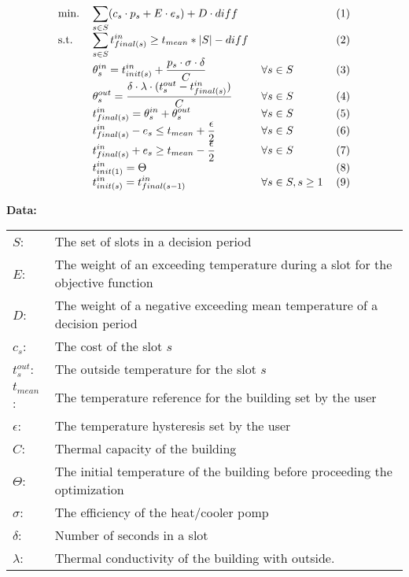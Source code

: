 \documentclass{article}
\begin{document}





\begin{align*}
\begin{tabular}{llll}
min. & $\displaystyle{\sum_{s \in S}(c_s \cdot p_s + E \cdot e_s) + D \cdot diff}$  &  & (1) \\
{s.t.} & $\displaystyle{\sum_{s \in S} t^{in}_{final(s)} \ge t_{mean}*|S| - diff}$ &  & (2) \\
& $\displaystyle{ \theta_{s}^{in} = t^{in}_{init(s)} + \frac{p_s \cdot \sigma \cdot \delta}{C}}$ & $\displaystyle{ \forall s \in S}$ & (3) \\
& $\displaystyle{\theta_{s}^{out} = \frac{\delta \cdot \lambda \cdot (t^{out}_s - t^{in}_{final(s)})}{C}}$ &  $\displaystyle{ \forall s \in S}$ & (4) \\
& $\displaystyle{t^{in}_{final(s)} = \theta^{in}_s + \theta^{out}_s}$ & $\displaystyle{ \forall s \in S}$ & (5) \\
& $\displaystyle{t^{in}_{final(s)} - e_s \le t_{mean} + \frac{\epsilon}{2}}$ & $\displaystyle{ \forall s \in S}$ & (6) \\
& $\displaystyle{t^{in}_{final(s)} + e_s \ge t_{mean} - \frac{\epsilon}{2}}$ & $\displaystyle{ \forall s \in S}$ & (7) \\
& $\displaystyle{t^{in}_{init(1)}} = \Theta$ & & (8) \\
& $\displaystyle{t^{in}_{init(s)} = t^{in}_{final(s-1)}}$ & $\displaystyle{ \forall s \in S, s \ge 1}$ & (9) \\
\end{tabular}
\end{align*}

\noindent
\textbf{Data:} \\
\begin{tabular}{ l p{} }
$S$: & The set of slots in a decision period \\
$E$: & The weight of an exceeding temperature during a slot for the objective function \\
$D$: & The weight of a negative exceeding mean temperature of a decision period \\
$c_s$: & The cost of the slot $s$ \\
$t^{out}_{s}$: & The outside temperature for the slot $s$\\
$t_{mean}$: & The temperature reference for the building set by the user \\
$\epsilon$: & The temperature hysteresis set by the user\\
$C$: & Thermal capacity of the building \\
$\Theta$: & The initial temperature of the building before proceeding the optimization \\
$\sigma$: & The efficiency of the heat/cooler pomp \\
$\delta$: & Number of seconds in a slot \\
$\lambda$: & Thermal conductivity of the building with outside. \\
\end{tabular} 
\vspace{0.3cm}
\end{document}
